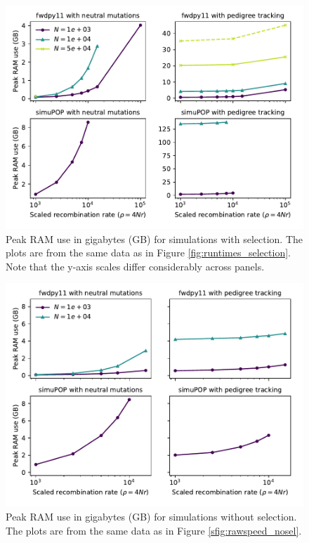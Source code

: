 \documentclass{article}
\begin{document}
\begin{figure}
    \includegraphics[]{sims/memuse}
    \caption{\label{sfig:ramsel}Peak RAM use in gigabytes (GB) for simulations with selection.  The plots are from the
        same data as in Figure \ref{fig:runtimes_selection}. Note that the y-axis scales differ considerably across
    panels.}
\end{figure}

\begin{figure}
    \includegraphics[]{sims/memuse_nosel}
    \caption{\label{sfig:ramnosel}Peak RAM use in gigabytes (GB) for simulations without selection.  The plots are from
    the same data as in Figure \ref{sfig:rawspeed_nosel}.}
\end{figure}
\end{document}
